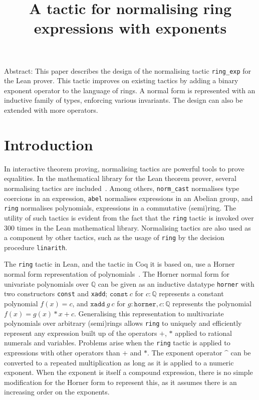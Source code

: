 \documentclass{llncs}
\title{A tactic for normalising ring expressions with exponents}
\newcommand{\Q}{\mathbb{Q}}
\newcommand{\lean}[1]{\texttt{#1}\xspace} %
\newcommand{\ringexp}{\lean{ring\_exp}}
\begin{document}
\maketitle

Abstract:
This paper describes the design of the normalising tactic \ringexp for the Lean prover.
This tactic improves on existing tactics by adding a binary exponent operator to the language of rings.
A normal form is represented with an inductive family of types, enforcing various invariants.
The design can also be extended with more operators.

\section{Introduction}

In interactive theorem proving, normalising tactics are powerful tools to prove equalities.
In the mathematical library for the Lean theorem prover,
several normalising tactics are included~\cite{mathlib}.
Among others,
\lean{norm\_cast} normalises type coercions in an expression,
\lean{abel} normalises expressions in an Abelian group,
and \lean{ring} normalises polynomials, expressions in a commutative (semi)ring.
The utility of such tactics is evident from the fact that the \lean{ring} tactic is invoked over 300 times in the Lean mathematical library.
Normalising tactics are also used as a component by other tactics,
such as the usage of \lean{ring} by the decision procedure \lean{linarith}.

The \lean{ring} tactic in Lean, and the tactic in Coq it is based on,
use a Horner normal form representation of polynomials~\cite{ring-tactic}.
The Horner normal form for univariate polynomials over $\Q$ can be given as an inductive datatype \lean{horner} with two constructors \lean{const} and \lean{xadd};
$\lean{const}\ c$ for $c : \Q$ represents a constant polynomial $f(x) = c$,
and $\lean{xadd}\ g\ c$ for $g : \lean{horner}, c : \Q$ represents the polynomial $f(x) = g(x) * x + c$.
Generalising this representation to multivariate polynomials over arbitrary (semi)rings allows \lean{ring} to uniquely and efficiently represent any expression built up of the operators $+$, $*$ applied to rational numerals and variables.
Problems arise when the \lean{ring} tactic is applied to expressions with other operators than $+$ and $*$.
The exponent operator $\^$ can be converted to a repeated multiplication as long as it is applied to a numeric exponent.
When the exponent is itself a compound expression, there is no simple modification for the Horner form to represent this,
as it assumes there is an increasing order on the exponents.
\end{document}
